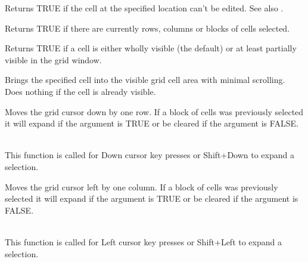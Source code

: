 Returns TRUE if the cell at the specified location can't be edited.
See also .

\label{wxgridisselection}


Returns TRUE if there are currently rows, columns or blocks of cells selected.

\label{wxgridisvisible}



Returns TRUE if a cell is either wholly visible (the default) or at least partially
visible in the grid window.

\label{wxgridmakecellvisible}



Brings the specified cell into the visible grid cell area with minimal scrolling. Does
nothing if the cell is already visible. 

\label{wxgridmovecursordown}


Moves the grid cursor down by one row. If a block of cells was previously selected it
will expand if the argument is TRUE or be cleared if the argument is FALSE.

\\
This function is called for Down cursor key presses or Shift+Down to expand a selection.

\label{wxgridmovecursorleft}


Moves the grid cursor left by one column. If a block of cells was previously selected it
will expand if the argument is TRUE or be cleared if the argument is FALSE.

\\
This function is called for Left cursor key presses or Shift+Left to expand a selection.

